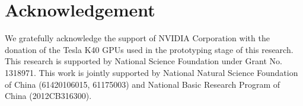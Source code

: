 \documentclass[10pt,twocolumn,letterpaper]{article}
\begin{document}






\section*{Acknowledgement}
We gratefully acknowledge the support of NVIDIA Corporation with the donation of the Tesla K40 GPUs used in the prototyping stage of this research.
This research is supported by National Science Foundation under Grant No. 1318971.
This work is jointly supported by National Natural Science Foundation of China (61420106015, 61175003) and National Basic Research Program of China (2012CB316300).

{\small


}
\end{document}
